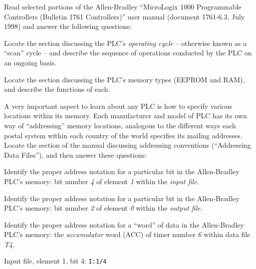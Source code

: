 

Read selected portions of the Allen-Bradley ``MicroLogix 1000 Programmable Controllers (Bulletin 1761 Controllers)'' user manual (document 1761-6.3, July 1998) and answer the following questions:

\vskip 10pt

Locate the section discussing the PLC's {\it operating cycle} -- otherwise known as a ``scan'' cycle -- and describe the sequence of operations conducted by the PLC on an ongoing basis.

\vskip 10pt

Locate the section discussing the PLC's memory types (EEPROM and RAM), and describe the functions of each.

\vskip 30pt

A very important aspect to learn about any PLC is how to specify various locations within its memory.  Each manufacturer and model of PLC has its own way of ``addressing'' memory locations, analogous to the different ways each postal system within each country of the world specifies its mailing addresses.  Locate the section of the manual discussing addressing conventions (``Addressing Data Files''), and then answer these questions:

\vskip 10pt

Identify the proper address notation for a particular bit in the Allen-Bradley PLC's memory: bit number {\it 4} of element {\it 1} within the {\it input file}.

\vskip 10pt

Identify the proper address notation for a particular bit in the Allen-Bradley PLC's memory: bit number {\it 2} of element {\it 0} within the {\it output file}.

\vskip 10pt

Identify the proper address notation for a ``word'' of data in the Allen-Bradley PLC's memory: the {\it accumulator} word (ACC) of timer number {\it 6} within data file {\it T4}.







Input file, element 1, bit 4: {\tt I:1/4}

\vskip 10pt

